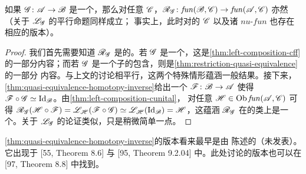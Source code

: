 \begin{lemma}\label{thm:right-composition-quasi-equivalence}
如果 $\mathscr{G}\colon\mathscr{A}\to\mathscr{B}$ 是一个\trQuasiequivalence，那么对任意 \trCunital{}
\trACategory{} $\mathscr{C}$，$\mathscr{R}_{\mathscr{G}}\colon\mathit{fun}(\mathscr{B},\mathscr{C})
\to\mathit{fun}(\mathscr{A},\mathscr{C})$ 亦然（关于 $\mathscr{L}_{\mathscr{G}}$ 的平行命题同样成立；
事实上，此时对\trNonunital{}的 $\mathscr{C}$ 以及诸\trCategory{}%
$\mathit{nu}\text{-}\mathit{fun}$ 也存在相应的版本）。
\end{lemma}
\begin{proof}
我们首先需要知道 $\mathscr{R}_{\mathscr{G}}$ 是\trCohomology\trFullyFaithful{}的。若 $\mathscr{G}$
是一个\trQuasiisomorphism，这是\cref{thm:left-composition-cff}的一部分内容；而若 $\mathscr{G}$
是一个\trFull{}子\trCategory{}的包含，则是\cref{thm:restriction-quasi-equivalence}的一部分
内容。与上文的讨论相平行，这两个特殊情形蕴涵一般结果。接下来，%
\cref{thm:quasi-equivalence-homotopy-inverse}给出一个 $\mathscr{F}\colon\mathscr{B}\to\mathscr{A}$
使得 $\mathscr{F}\circ\mathscr{G}\simeq\mathrm{Id}_{\mathscr{B}}$。由\cref{thm:left-composition-cunital}，
对任意 $\mathscr{H}\in\operatorname{Ob}\mathit{fun}(\mathscr{A},\mathscr{C})$ 可得
$\mathscr{R}_{\mathscr{G}}(\mathscr{H}\circ\mathscr{F})
=\mathscr{L}_{\mathscr{H}}(\mathscr{F}\circ\mathscr{G})
\simeq\mathscr{L}_{\mathscr{H}}(\mathrm{Id}_{\mathscr{B}})=\mathscr{H}$，这蕴涵 $\mathscr{R}_{\mathscr{G}}$
在\trObject{}的\trIsomorphism{}类上是一个\trSurjective。关于 $\mathscr{L}_{\mathscr{G}}$
的论证类似，只是稍微简单一点。
\end{proof}

\begin{remark}\label{thm:strictly-unital-version-history}
\cref{thm:quasi-equivalence-homotopy-inverse}的\trStrictlyUnital{}版本看来最早是由%
\trKontsevich{}陈述的（未发表）。它出现于 [55, Theorem 8.6] 与 [95, Theorem 9.2.04]
中。此处讨论的\trCunital{}版本也可以在 [97, Theorem 8.8] 中找到。
\end{remark}
